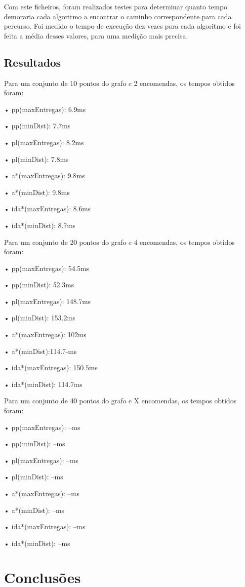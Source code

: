 \documentclass[a4paper]{article}
\begin{document}
Com este ficheiros, foram realizados testes para determinar quanto tempo demoraria cada algoritmo a encontrar o caminho correspondente para cada percurso. Foi medido o tempo de execução dez vezes para cada algoritmo e foi feita a média desses valores, para uma medição mais precisa.
\subsection{Resultados}
Para um conjunto de 10 pontos do grafo e 2 encomendas, os tempos obtidos foram:

	• pp(maxEntregas): 6.9ms

	• pp(minDist): 7.7ms

	• pl(maxEntregas): 8.2ms

	• pl(minDist): 7.8ms

	• a*(maxEntregas): 9.8ms

	• a*(minDist): 9.8ms

	• ida*(maxEntregas): 8.6ms

	• ida*(minDist): 8.7ms
\newline

Para um conjunto de 20 pontos do grafo e 4 encomendas, os tempos obtidos foram:

	• pp(maxEntregas): 54.5ms

	• pp(minDist): 52.3ms

	• pl(maxEntregas): 148.7ms

	• pl(minDist): 153.2ms

	• a*(maxEntregas): 102ms

	• a*(minDist):114.7-ms

	• ida*(maxEntregas): 150.5ms

	• ida*(minDist): 114.7ms
\newline

Para um conjunto de 40 pontos do grafo e X encomendas, os tempos obtidos foram:

	• pp(maxEntregas): --ms

	• pp(minDist): --ms

	• pl(maxEntregas): --ms

	• pl(minDist): --ms

	• a*(maxEntregas): --ms

	• a*(minDist): --ms

	• ida*(maxEntregas): --ms

	• ida*(minDist): --ms

\newpage

\section{Conclusões}
\end{document}
